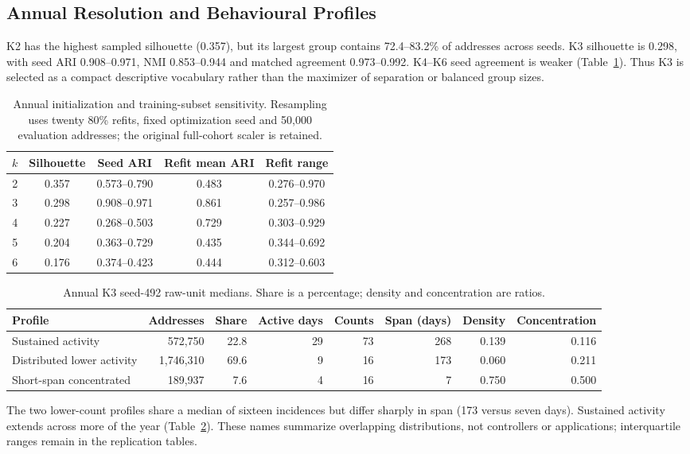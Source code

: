 \documentclass[journal,letterpaper]{IEEEtran}
\begin{document}
\subsection{Annual Resolution and Behavioural Profiles}
K2 has the highest sampled silhouette (0.357), but its largest group contains 72.4--83.2\% of addresses across seeds. K3 silhouette is 0.298, with seed ARI 0.908--0.971, NMI 0.853--0.944 and matched agreement 0.973--0.992. K4--K6 seed agreement is weaker (Table~\ref{tab:annualrobustness}). Thus K3 is selected as a compact descriptive vocabulary rather than the maximizer of separation or balanced group sizes.

\begin{table}[!t]
\centering\footnotesize
\caption{Annual initialization and training-subset sensitivity. Resampling uses twenty 80\% refits, fixed optimization seed and 50,000 evaluation addresses; the original full-cohort scaler is retained.}
\label{tab:annualrobustness}
\begin{tabular}{rcccc}
\toprule
$k$ & Silhouette & Seed ARI & Refit mean ARI & Refit range \\
\midrule
2 & 0.357 & 0.573--0.790 & 0.483 & 0.276--0.970 \\
3 & 0.298 & 0.908--0.971 & 0.861 & 0.257--0.986 \\
4 & 0.227 & 0.268--0.503 & 0.729 & 0.303--0.929 \\
5 & 0.204 & 0.363--0.729 & 0.435 & 0.344--0.692 \\
6 & 0.176 & 0.374--0.423 & 0.444 & 0.312--0.603 \\
\bottomrule
\end{tabular}
\end{table}
\begin{table}[!t]
\centering\footnotesize
\caption{Annual K3 seed-492 raw-unit medians. Share is a percentage; density and concentration are ratios.}
\label{tab:profiles}
\begin{tabular}{lrrrrrrr}
\toprule
Profile & Addresses & Share & Active days & Counts & Span (days) & Density & Concentration \\
\midrule
Sustained activity & 572,750 & 22.8 & 29 & 73 & 268 & 0.139 & 0.116 \\
Distributed lower activity & 1,746,310 & 69.6 & 9 & 16 & 173 & 0.060 & 0.211 \\
Short-span concentrated & 189,937 & 7.6 & 4 & 16 & 7 & 0.750 & 0.500 \\
\bottomrule
\end{tabular}
\end{table}
The two lower-count profiles share a median of sixteen incidences but differ sharply in span (173 versus seven days). Sustained activity extends across more of the year (Table~\ref{tab:profiles}). These names summarize overlapping distributions, not controllers or applications; interquartile ranges remain in the replication tables.
\end{document}
